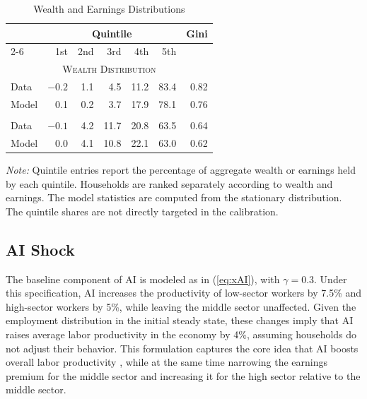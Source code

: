 \documentclass[12pt,english]{article}
\numberwithin{equation}{section}
\begin{document}
\begin{table}[htbp]
\centering
\caption{Wealth and Earnings Distributions}
\label{tab:SSdistribution}
\begin{tabular}{lrrrrrr}
\toprule
& \multicolumn{5}{c}{Quintile} & Gini \\
\cmidrule(lr){2-6}
& 1st & 2nd & 3rd & 4th & 5th & \\
\midrule
\multicolumn{7}{c}{\textsc{Wealth Distribution}} \\
\addlinespace
Data  & $-0.2$ & 1.1 & 4.5 & 11.2 & 83.4 & 0.82 \\
Model & 0.1    & 0.2 & 3.7 & 17.9 & 78.1 & 0.76 \\
\addlinespace
\multicolumn{7}{c}{\textsc{Earnings Distribution}} \\
\addlinespace
Data  & $-0.1$ & 4.2 & 11.7 & 20.8 & 63.5 & 0.64 \\
Model & 0.0    & 4.1 & 10.8 & 22.1 & 63.0 & 0.62 \\
\bottomrule
\end{tabular}

\begin{minipage}{0.92\textwidth}
\scriptsize
\textit{Note:} Quintile entries report the percentage of aggregate wealth or
earnings held by each quintile. Households are ranked separately according to
wealth and earnings. The model statistics are computed from the stationary
distribution. The quintile shares are not directly targeted in the calibration.
\end{minipage}
\end{table}

\subsection{AI Shock}

The baseline component of AI is modeled as in (\ref{eq:xAI}), with $\gamma=0.3$. Under this specification, AI increases the productivity of low-sector workers by 7.5\% and high-sector workers by 5\%, while leaving the middle sector unaffected. Given the employment distribution in the initial steady state, these changes imply that AI raises average labor productivity in the economy by 4\%, assuming households do not adjust their behavior. This formulation captures the core idea that AI boosts overall labor productivity \parencites{Acemoglu2019a}, while at the same time narrowing the earnings premium for the middle sector and increasing it for the high sector relative to the middle sector.
\end{document}
